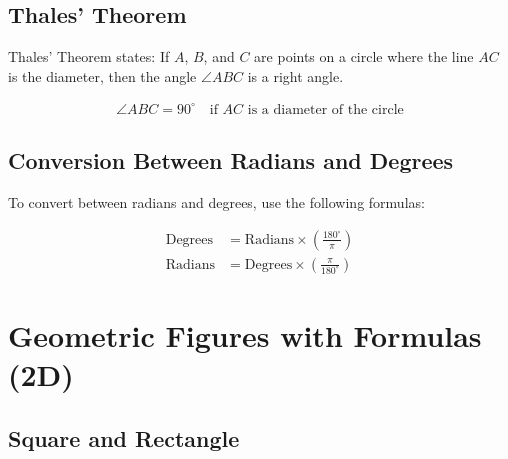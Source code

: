 
\subsection{Thales' Theorem}

Thales' Theorem states:
If \( A \), \( B \), and \( C \) are points on a circle where the line \( AC \) is the diameter, then the angle \( \angle ABC \) is a right angle.


\begin{align*}
\angle ABC = 90^\circ \quad \text{if } AC \text{ is a diameter of the circle}
\end{align*}


\subsection{Conversion Between Radians and Degrees}

To convert between radians and degrees, use the following formulas:

\begin{align*}
\text{Degrees} &= \text{Radians} \times \left( \frac{180^\circ}{\pi} \right) \\
\text{Radians} &= \text{Degrees} \times \left( \frac{\pi}{180^\circ} \right)
\end{align*}

\section*{Geometric Figures with Formulas (2D)}

\subsection*{Square and Rectangle}
\begin{center}
\end{center}

